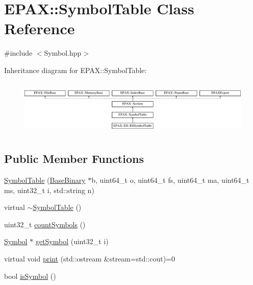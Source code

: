 \hypertarget{class_e_p_a_x_1_1_symbol_table}{\section{\-E\-P\-A\-X\-:\-:\-Symbol\-Table \-Class \-Reference}
\label{class_e_p_a_x_1_1_symbol_table}
}


{\ttfamily \#include $<$\-Symbol.\-hpp$>$}

\-Inheritance diagram for \-E\-P\-A\-X\-:\-:\-Symbol\-Table\-:\begin{figure}[H]
\begin{center}
\leavevmode
\includegraphics[height=2.666667cm]{class_e_p_a_x_1_1_symbol_table}
\end{center}
\end{figure}
\subsection*{\-Public \-Member \-Functions}
\begin{DoxyCompactItemize}
\item 
\hyperlink{class_e_p_a_x_1_1_symbol_table_a5a287e768e39c5bbb7325a5039c5569f}{\-Symbol\-Table} (\hyperlink{class_e_p_a_x_1_1_base_binary}{\-Base\-Binary} $\ast$b, uint64\-\_\-t o, uint64\-\_\-t fs, uint64\-\_\-t ma, uint64\-\_\-t ms, uint32\-\_\-t i, std\-::string n)
\item 
virtual \hyperlink{class_e_p_a_x_1_1_symbol_table_a97d8c6f6517b3ae2ea39f0c47dd60a5b}{$\sim$\-Symbol\-Table} ()
\item 
uint32\-\_\-t \hyperlink{class_e_p_a_x_1_1_symbol_table_a229729af626ddb0763a1bff287b68918}{count\-Symbols} ()
\item 
\hyperlink{class_e_p_a_x_1_1_symbol}{\-Symbol} $\ast$ \hyperlink{class_e_p_a_x_1_1_symbol_table_a6a4a90088e81ef66cf665c241b9fa1f0}{get\-Symbol} (uint32\-\_\-t i)
\item 
virtual void \hyperlink{class_e_p_a_x_1_1_symbol_table_ac8a581679e678f1472bf684fdf877b9a}{print} (std\-::ostream \&stream=std\-::cout)=0
\item 
bool \hyperlink{class_e_p_a_x_1_1_symbol_table_a86c210d632debcae293bd2167a3cbe62}{is\-Symbol} ()
\end{DoxyCompactItemize}
